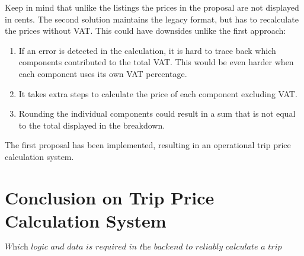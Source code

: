 Keep in mind that unlike the listings the prices in the proposal are not displayed in cents. The second solution maintains the legacy format, but has to recalculate the prices without VAT. This could have downsides unlike the first approach:

\begin{enumerate}
	\item If an error is detected in the calculation, it is hard to trace back which components contributed to the total VAT. This would be even harder when each component uses its own VAT percentage.
	\item It takes extra steps to calculate the price of each component excluding VAT.
	\item Rounding the individual components could result in a sum that is not equal to the total displayed in the breakdown.
\end{enumerate}

The first proposal has been implemented, resulting in an operational trip price calculation system.

\section{Conclusion on Trip Price Calculation System}
\[\textit{Which logic and data is required in the backend to reliably calculate a trip price?}\]\hfill

